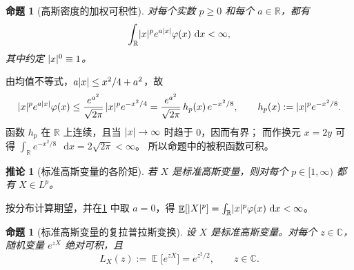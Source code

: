 \documentclass[UTF8,11pt,a4paper,oneside,fontset=fandol]{ctexrep}
\makeatletter
\numberwithin{equation}{section}
\theoremstyle{zhthm}
\newtheorem{proposition}[theorem]{命题}
\newtheorem{corollary}[theorem]{推论}
\renewenvironment{proof}[1][\proofname]{\par
  \pushQED{\qed}%
  \normalfont\topsep6\p@\@plus6\p@\relax
  \trivlist
  \item[\hskip\labelsep\bfseries#1\hspace{0.5em}]\ignorespaces
}{%
  \popQED\endtrivlist\@endpefalse
}
\renewcommand{\proofname}{证明}
\newcommand{\R}{\mathbb{R}}
\newcommand{\C}{\mathbb{C}}
\DeclareMathOperator{\E}{\mathbb{E}}
\newcommand{\dd}{\mathop{}\!\mathrm{d}}
\DeclarePairedDelimiter{\abs}{\lvert}{\rvert}
\makeatother
\begin{document}
\begin{proposition}[高斯密度的加权可积性]
\label{prop:gaussian-integrability}
对每个实数 $p\ge0$ 和每个 $a\in\R$，都有
\[
  \int_{\R}\abs{x}^{p}e^{a\abs{x}}\varphi(x)\,\dd x<\infty,
\]
其中约定 $\abs{x}^0\equiv1$。
\end{proposition}

\begin{proof}
由均值不等式，$a\abs{x}\le x^2/4+a^2$，故
\[
  \abs{x}^{p}e^{a\abs{x}}\varphi(x)
  \le\frac{e^{a^2}}{\sqrt{2\pi}}\,\abs{x}^{p}e^{-x^2/4}
  =\frac{e^{a^2}}{\sqrt{2\pi}}\,h_p(x)\,e^{-x^2/8},
  \qquad h_p(x):=\abs{x}^{p}e^{-x^2/8}.
\]
函数 $h_p$ 在 $\R$ 上连续，且当 $\abs{x}\to\infty$ 时趋于 $0$，因而有界；
而作换元 $x=2y$ 可得 $\int_{\R}e^{-x^2/8}\,\dd x=2\sqrt{2\pi}<\infty$。
所以命题中的被积函数可积。
\end{proof}

\begin{corollary}[标准高斯变量的各阶矩]
\label{cor:gaussian-lp}
若 $X$ 是标准高斯变量，则对每个 $p\in[1,\infty)$ 都有 $X\in L^p$。
\end{corollary}

\begin{proof}
按分布计算期望，并在\cref{prop:gaussian-integrability} 中取 $a=0$，得
$\E[\abs{X}^{p}]=\int_{\R}\abs{x}^{p}\varphi(x)\,\dd x<\infty$。
\end{proof}

\begin{proposition}[标准高斯变量的复拉普拉斯变换]
\label{prop:gaussian-laplace}
设 $X$ 是标准高斯变量。对每个 $z\in\C$，随机变量 $e^{zX}$ 绝对可积，且
\begin{equation}
  \label{eq:gaussian-laplace}
  L_X(z):=\E\bigl[e^{zX}\bigr]=e^{z^2/2},
  \qquad z\in\C.
\end{equation}
\end{proposition}
\end{document}
